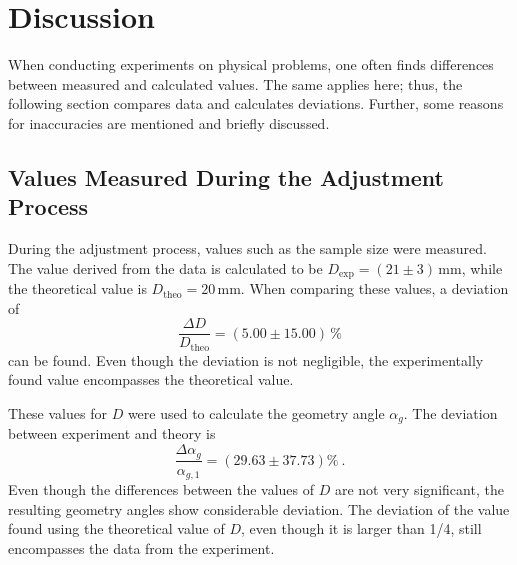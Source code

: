 
\section{Discussion}

When conducting experiments on physical problems, one often finds differences between measured and calculated values. The same applies here; thus, the following section compares data and calculates deviations. Further, some reasons for inaccuracies are mentioned and briefly discussed.

\subsection{Values Measured During the Adjustment Process}

During the adjustment process, values such as the sample size were measured. The value derived from the data is calculated to be $D_{\text{exp}} = (21 \pm 3)\, \unit{\milli \meter}$, while the theoretical value is $D_{\text{theo}} = 20 \, \unit{\milli \meter}$. When comparing these values, a deviation of 
\begin{equation*}
    \frac{\Delta D}{D_{\text{theo}}} = (5.00 \pm 15.00) \, \%
\end{equation*}
can be found. Even though the deviation is not negligible, the experimentally found value encompasses the theoretical value.

These values for $D$ were used to calculate the geometry angle $\alpha_g$. The deviation between experiment and theory is
\begin{equation*}
    \frac{\Delta \alpha_g}{\alpha_{g,1}} = (29.63 \pm 37.73) \% \: .
\end{equation*}
Even though the differences between the values of $D$ are not very significant, the resulting geometry angles show considerable deviation. The deviation of the value found using the theoretical value of $D$, even though it is larger than 1/4, still encompasses the data from the experiment.

